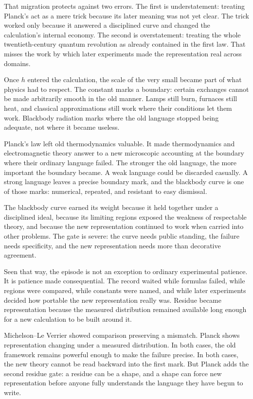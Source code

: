 That migration protects against two errors. The first is understatement:
treating Planck's act as a mere trick because its later meaning was not
yet clear. The trick worked only because it answered a disciplined curve
and changed the calculation's internal economy. The second is
overstatement: treating the whole twentieth-century quantum revolution as
already contained in the first law. That misses the work by which later
experiments made the representation real across domains.

Once $h$ entered the calculation, the scale of the very small became part
of what physics had to respect. The constant marks a boundary: certain
exchanges cannot be made arbitrarily smooth in the old manner. Lamps
still burn, furnaces still heat, and classical approximations still work
where their conditions let them work. Blackbody radiation marks where the
old language stopped being adequate, not where it became useless.

Planck's law left old thermodynamics valuable. It made
thermodynamics and electromagnetic theory answer to a new microscopic
accounting at the boundary where their ordinary language failed. The
stronger the old language, the more important the boundary became. A weak
language could be discarded casually. A strong language leaves a precise
boundary mark, and the blackbody curve is one of those marks: numerical,
repeated, and resistant to easy dismissal.

The blackbody curve earned its weight because it held together under a
disciplined ideal, because its limiting regions exposed the weakness of
respectable theory, and because the new representation continued to work
when carried into other problems. The gate is severe: the curve needs public standing, the failure needs
specificity, and the new representation needs more than decorative
agreement.

Seen that way, the episode is not an exception to ordinary experimental
patience. It is patience made consequential. The record waited while
formulas failed, while regions were compared, while constants were named,
and while later experiments decided how portable the new representation
really was. Residue became representation because the measured distribution remained
available long enough for a new calculation to be built around it.

Michelson--Le Verrier showed comparison preserving a mismatch. Planck
shows representation changing under a measured distribution. In both cases,
the old framework remains powerful enough to make the failure precise. In
both cases, the new theory cannot be read backward into the first mark.
But Planck adds the second residue gate: a residue can be a shape, and a
shape can force new representation before anyone fully understands the
language they have begun to write.

